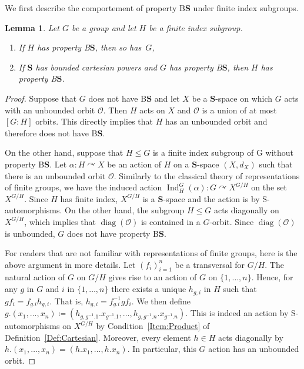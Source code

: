 \documentclass[a4paper]{article}
\newtheorem{lem}{Lemma}[section]
\theoremstyle{definition}
\DeclareMathOperator\Ind{Ind}
\DeclareMathOperator\diag{diag}
\newcommand*{\orbite}{\mathcal O}
\newcommand*{\BS}{B$\mathbf{S}$}
\begin{document}
We first describe the comportement of property \BS{} under finite index subgroups.
%
%
\begin{lem}\label{Lemma:Subgroup}
Let $G$ be a group and let $H$ be a finite index subgroup.
\begin{enumerate}
\item
If $H$ has property \BS, then so has~$G$,
\item
If $\mathbf{S}$ has bounded cartesian powers and $G$ has property \BS, then $H$ has property \BS.
\end{enumerate}
\end{lem}
\begin{proof}
Suppose that $G$ does not have \BS{} and let $X$ be a $\mathbf S$-space on which $G$ acts with an unbounded orbit $\orbite$.
Then $H$ acts on $X$ and $\orbite$ is a union of at most $[G:H]$ orbits. This directly implies that $H$ has an unbounded orbit and therefore does not have \BS.

On the other hand, suppose that $H\leq G$ is a finite index subgroup of G without property \BS.
Let $\alpha\colon H\curvearrowright X$ be an action of $H$ on a $\mathbf S$-space $(X,d_X)$ such that there is an unbounded orbit $\orbite$.
Similarly to the classical theory of representations of finite groups, we have the induced  action $\Ind_H^G(\alpha)\colon G \curvearrowright X^{G/H}$ on the set $X^{G/H}$. Since $H$ has finite index, $X^{G/H}$ is a $\mathbf S$-space and the action is by S-automorphisms. On the other hand, the subgroup $H\leq G$ acts diagonally on $X^{G/H}$, which implies that $\diag(\orbite)$ is contained in a $G$-orbit.
Since $\diag(\orbite)$ is unbounded, $G$ does not have property \BS.

For readers that are not familiar with representations of finite groups, here is the above argument in more details.
Let $(f_i)_{i=1}^n$ be a transversal for $G/H$.
The natural action of $G$ on $G/H$ gives rise to an action of $G$ on $\{1,\dots,n\}$.
Hence, for any $g$ in $G$ and $i$ in $\{1,\dots,n\}$ there exists a unique $h_{g,i}$ in $H$ such that $gf_i=f_{g.i}h_{g,i}$. That is, $h_{g,i}=f_{g.i}^{-1}gf_i$.
We then define $g.(x_1,\dots,x_n)\coloneqq(h_{g,g^{-1}.1}.x_{g^{-1}.1},\dots,h_{g,g^{-1}.n}.x_{g^{-1}.n})$. This is indeed an action by S-automorphisms on $X^{G/H}$ by Condition~\ref{Item:Product} of Definition~\ref{Def:Cartesian}.
Moreover, every element $h\in H$ acts diagonally by $h.(x_1,\dots,x_n)=(h.x_1,\dots,h.x_n)$.
In particular, this $G$ action has an unbounded orbit.
\end{proof}
%
%
\end{document}
